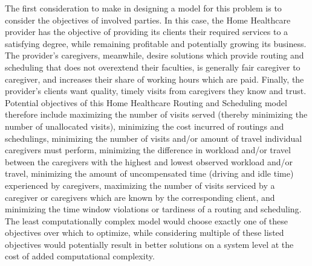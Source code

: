 \documentclass[11pt,twoside]{article}
\numberwithin{Theorem}{section}
\numberwithin{Definition}{section}
\numberwithin{Lemma}{section}
\numberwithin{Algorithm}{section}
\numberwithin{equation}{section}
\begin{document}
The first consideration to make in designing a model for this problem is to consider the objectives of involved parties. In this case, the Home Healthcare provider has the objective of providing its clients their required services to a satisfying degree, while remaining profitable and potentially growing its business. The provider's caregivers, meanwhile, desire solutions which provide routing and scheduling that does not overextend their faculties, is generally fair caregiver to caregiver, and increases their share of working hours which are paid. Finally, the provider's clients want quality, timely visits from caregivers they know and trust. Potential objectives of this Home Healthcare Routing and Scheduling model therefore include maximizing the number of visits served (thereby minimizing the number of unallocated visits), minimizing the cost incurred of routings and schedulings, minimizing the number of visits and/or amount of travel individual caregivers must perform, minimizing the difference in workload and/or travel between the caregivers with the highest and lowest observed workload and/or travel, minimizing the amount of uncompensated time (driving and idle time) experienced by caregivers, maximizing the number of visits serviced by a caregiver or caregivers which are known by the corresponding client, and minimizing the time window violations or tardiness of a routing and scheduling. The least computationally complex model would choose exactly one of these objectives over which to optimize, while considering multiple of these listed objectives would potentially result in better solutions on a system level at the cost of added computational complexity.
\end{document}
